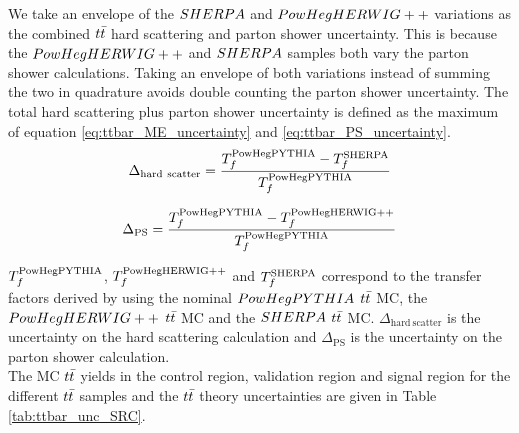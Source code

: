 \indent We take an envelope of the $SHERPA$ and $PowHegHERWIG++$ variations as the combined $t\bar{t}$ hard scattering and parton shower uncertainty.  This is because the $PowHegHERWIG++$ and $SHERPA$ samples both vary the parton shower calculations.  Taking an envelope of both variations instead of summing the two in quadrature avoids double counting the parton shower uncertainty. The total hard scattering plus parton shower uncertainty is defined as the maximum of equation \ref{eq:ttbar_ME_uncertainty} and \ref{eq:ttbar_PS_uncertainty}.  \\

    \begin{eqnarray}
      \Delta_{\mathrm{hard~scatter}} = \frac{T_f^{\mathrm{PowHegPYTHIA}} - T_f^{\mathrm{SHERPA}}}{T_f^{\mathrm{PowHegPYTHIA}}}
      \label{eq:ttbar_ME_uncertainty}
    \end{eqnarray}

    \begin{eqnarray}
      \Delta_{\mathrm{PS}} = \frac{T_f^{\mathrm{PowHegPYTHIA}} - T_f^{\mathrm{PowHegHERWIG++}}}{T_f^{\mathrm{PowHegPYTHIA}}}
      \label{eq:ttbar_PS_uncertainty}
    \end{eqnarray}

\indent $T_f^{\mathrm{PowHegPYTHIA}}$, $T_f^{\mathrm{PowHegHERWIG++}}$ and $T_f^{\mathrm{SHERPA}}$ correspond to the transfer factors derived by using the nominal $PowHegPYTHIA$ $t\bar{t}$ MC, the $PowHegHERWIG++$ $t\bar{t}$ MC and the $SHERPA$ $t\bar{t}$ MC.  $\Delta_{\mathrm{hard~scatter}}$ is the uncertainty on the hard scattering calculation and $\Delta_{\mathrm{PS}}$ is the uncertainty on the parton shower calculation. \\

\indent The MC $t\bar{t}$ yields in the control region, validation region and signal region for the different $t\bar{t}$ samples and the $t\bar{t}$ theory uncertainties are given in Table \ref{tab:ttbar_unc_SRC}.  \\

\pagebreak
  
